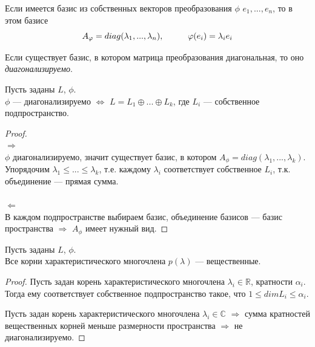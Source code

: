 Если имеется базис из собственных векторов преобразования $\phi$ $e_1, ..., e_n$, то в этом базисе
\[
A_{\varphi} = diag(\lambda_1, ..., \lambda_n),\hspace*{1cm}\varphi(e_i) = \lambda_ie_i
\]
\begin{definition}
    Если существует базис, в котором матрица преобразования диагональная, то оно \textit{диагонализируемо}.
\end{definition}

\begin{theorem}
    Пусть заданы $L$, $\phi$.\\
    $\phi$ --- диагонализируемо $\Longleftrightarrow$ $L = L_1\oplus ... \oplus L_k$, где $L_i$ --- собственное подпространство.
\end{theorem}
\begin{proof}
    \tab\\
    $\Longrightarrow$\\
    $\phi$ диагонализируемо, значит существует базис, в котором $A_{\phi} = diag(\lambda_1, ..., \lambda_k)$. Упорядочим $\lambda_1 \leq ... \leq \lambda_k$, т.е. каждому $\lambda_i$ соответствует собственное $L_i$, т.к. объединение --- прямая сумма.\\
    \tab\\
    $\Longleftarrow$\\
    В каждом подпространстве выбираем базис, объединение базисов --- базис пространства $\Longrightarrow$ $A_{\phi}$ имеет нужный вид.
\end{proof}

\begin{theorem}
    Пусть заданы $L$, $\phi$.\\
    Все корни характеристического многочлена $p(\lambda)$ --- вещественные.
\end{theorem}
\begin{proof}
Пусть задан корень характеристического многочлена $\lambda_i \in \mathbb{R}$, кратности $\alpha_i$. Тогда ему соответствует собственное подпространство такое, что $1 \leq dim L_i \leq \alpha_i$.

Пусть задан корень характеристического многочлена $\lambda_i \in \mathbb{C}$ $\Longrightarrow$ сумма кратностей вещественных корней меньше размерности пространства $\Longrightarrow$ не диагонализируемо.
\end{proof}

